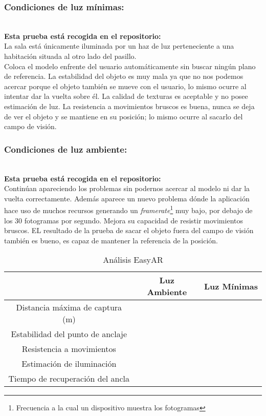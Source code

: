 \subsubsection{Condiciones de luz mínimas:}\\
\textbf{Esta prueba está recogida en el repositorio:}\\
La sala está únicamente iluminada por un haz de luz perteneciente a una habitación situada al otro lado del pasillo.\\

Coloca el modelo enfrente del usuario automáticamente sin buscar ningún plano de referencia. La estabilidad del objeto es muy mala ya que no nos podemos acercar porque el objeto también se mueve con el usuario, lo mismo ocurre al intentar dar la vuelta sobre él. La calidad de texturas es aceptable y no posee estimación de luz. La resistencia a movimientos bruscos es buena, nunca se deja de ver el objeto y se mantiene en su posición; lo mismo ocurre al sacarlo del campo de visión.

\subsubsection{Condiciones de luz ambiente:}\\
\textbf{Esta prueba está recogida en el repositorio:}\\
Continúan apareciendo los problemas sin podernos acercar al modelo ni dar la vuelta correctamente. Además aparece un nuevo problema dónde la aplicación hace uso de muchos recursos generando un \textit{framerate}\footnote{Frecuencia a la cual un dispositivo muestra los fotogramas} muy bajo, por debajo de los 30 fotogramas por segundo. Mejora su capacidad de resistir movimientos bruscos. EL resultado de la prueba de sacar el objeto fuera del campo de visión también es bueno, es capaz de mantener la referencia de la posición.

\begin{table}[H]
    \centering
    \begin{tabular}{|c|c|c|}
    \hline
          & Luz Ambiente & Luz Mínimas \\
         \hline
        Distancia máxima de captura (m)  & &\\
        \hline
        Estabilidad del punto de anclaje  & &\\
        \hline
        Resistencia a movimientos  & & \\
        \hline
        Estimación de iluminación  & & \\
        \hline
        Tiempo de recuperación del ancla  & & \\
      \hline
    \end{tabular}
    \caption{Análisis EasyAR}
    \label{tab:EasyAR}
\end{table}
